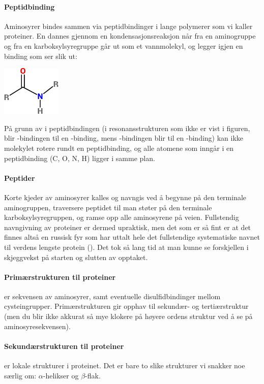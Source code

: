 \paragraph{Peptidbinding} Aminosyrer bindes sammen via peptidbindinger i lange polymerer som vi kaller proteiner. En  dannes gjennom en kondensasjonsreaksjon når  fra en aminogruppe og  fra en karboksylsyregruppe går ut som et vannmolekyl, og legger igjen en binding som ser slik ut:
\begin{center}
	\includegraphics[scale=0.5]{peptide}
\end{center}
På grunn av  i peptidbindingen (i resonansstrukturen som ikke er vist i figuren, blir -bindingen til en -binding, mens -bindingen blir til en -binding) kan ikke molekylet rotere rundt en peptidbinding, og alle atomene som inngår i en peptidbinding (C, O, N, H) ligger i samme plan.

\paragraph{Peptider} Korte kjeder av aminosyrer kalles  og navngis ved å begynne på den terminale aminogruppen, traversere peptidet til man støter på den terminale karboksylsyregruppen, og ramse opp alle aminosyrene på veien. Fullstendig navngivning av proteiner er dermed upraktisk, men det som er så fint er at det finnes altså en russisk fyr som har uttalt hele det fullstendige systematiske navnet til verdens lengste protein (). Det tok så lang tid at man kunne se forskjellen i skjeggvekst på starten og slutten av opptaket.

\paragraph{Primærstrukturen til proteiner} er sekvensen av aminosyrer, samt eventuelle disulfidbindinger mellom cysteingrupper. Primærstrukturen gir opphav til sekundær- og tertiærstruktur (men du blir ikke akkurat så mye klokere på høyere ordens struktur ved å se på aminosyresekvensen). 

\paragraph{Sekundærstrukturen til proteiner} er lokale strukturer i proteinet. Det er bare to slike strukturer vi snakker noe særlig om: $\alpha$-helikser og $\beta$-flak.

